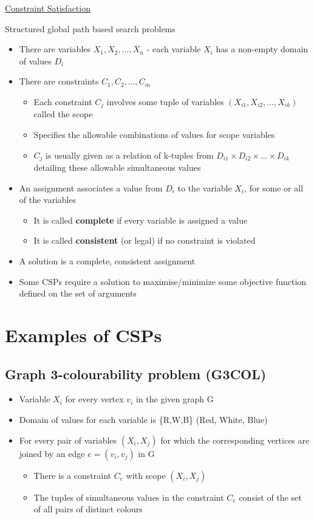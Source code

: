 \documentclass{article}[18pt]
\begin{document}
\begin{center}
\underline{\huge Constraint Satisfaction}
\end{center}

\begin{defin}
Structured global path based search problems
\begin{itemize}
	\item There are variables $X_1,X_2,...,X_n$ - each variable $X_i$ has a non-empty domain of values $D_i$
	\item There are constraints $C_1,C_2,...,C_m$
	\begin{itemize}
		\item Each constraint $C_j$ involves some tuple of variables $(X_{i1}, X_{i2},...,X_{ik})$ called the scope
		\item Specifies the allowable combinations of values for scope variables
		\item $C_j$ is usually given as a relation of k-tuples from $D_{i1}\times D_{i2}\times \ldots \times D_{ik}$ detailing these allowable simultaneous values
	\end{itemize}
	\item An assignment associates a value from $D_i$ to the variable $X_i$, for some or all of the variables
	\begin{itemize}
		\item It is called \textbf{complete} if every variable is assigned a value
		\item It is called \textbf{consistent} (or legal) if no constraint is violated
	\end{itemize}
	\item A solution is a complete, consistent assignment
	\item Some CSPs require a solution to maximise/minimize some objective function defined on the set of arguments
\end{itemize}
\end{defin}
\section{Examples of CSPs}
\subsection{Graph 3-colourability problem (G3COL)}
\begin{itemize}
	\item Variable $X_i$ for every vertex $v_i$ in the given graph G
	\item Domain of values for each variable is \{R,W,B\} (Red, White, Blue)
	\item For every pair of variables $(X_i,X_j)$ for which the corresponding vertices are joined by an edge $e=(v_i,v_j)$ in G
	\begin{itemize}
		\item There is a constraint $C_e$ with scope $(X_i,X_j)$
		\item The tuples of simultaneous values in the constraint $C_e$ consist of the set of all pairs of distinct colours
	\end{itemize}
\end{itemize}
\end{document}
